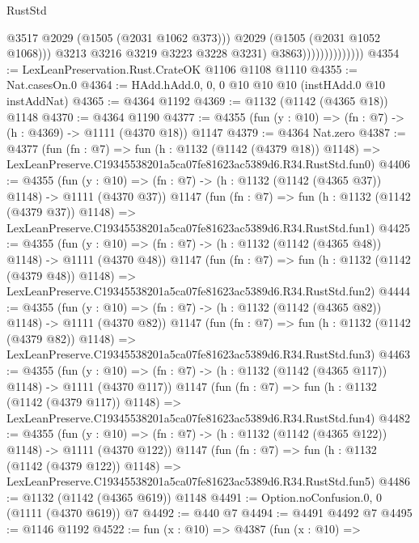 \begin{lexlean}{RustStd}
\begin{coremodule}
                                      @3517
                                      @2029
                                      (@1505 (@2031 @1062 @373)))
                                    @2029
                                    (@1505 (@2031 @1052 @1068)))
                                  @3213
                                  @3216
                                  @3219
                                  @3223
                                  @3228
                                  @3231)
                                @3863))))))))))))))
@4354 := LexLeanPreservation.Rust.CrateOK @1106 @1108 @1110
@4355 := Nat.casesOn.{0}
@4364 := HAdd.hAdd.{0, 0, 0} @10 @10 @10 (instHAdd.{0} @10 instAddNat)
@4365 := @4364 @1192
@4369 := @1132 (@1142 (@4365 @18)) @1148
@4370 := @4364 @1190
@4377 := @4355 (fun (y : @10) => (fn : @7) -> (h : @4369) -> @1111 (@4370 @18)) @1147
@4379 := @4364 Nat.zero
@4387 := @4377
    (fun (fn : @7) =>
    fun (h : @1132 (@1142 (@4379 @18)) @1148) =>
    LexLeanPreserve.C19345538201a5ca07fe81623ac5389d6.R34.RustStd.fun0)
@4406 := @4355
    (fun (y : @10) => (fn : @7) -> (h : @1132 (@1142 (@4365 @37)) @1148) -> @1111 (@4370 @37))
    @1147
    (fun (fn : @7) =>
    fun (h : @1132 (@1142 (@4379 @37)) @1148) =>
    LexLeanPreserve.C19345538201a5ca07fe81623ac5389d6.R34.RustStd.fun1)
@4425 := @4355
    (fun (y : @10) => (fn : @7) -> (h : @1132 (@1142 (@4365 @48)) @1148) -> @1111 (@4370 @48))
    @1147
    (fun (fn : @7) =>
    fun (h : @1132 (@1142 (@4379 @48)) @1148) =>
    LexLeanPreserve.C19345538201a5ca07fe81623ac5389d6.R34.RustStd.fun2)
@4444 := @4355
    (fun (y : @10) => (fn : @7) -> (h : @1132 (@1142 (@4365 @82)) @1148) -> @1111 (@4370 @82))
    @1147
    (fun (fn : @7) =>
    fun (h : @1132 (@1142 (@4379 @82)) @1148) =>
    LexLeanPreserve.C19345538201a5ca07fe81623ac5389d6.R34.RustStd.fun3)
@4463 := @4355
    (fun (y : @10) => (fn : @7) -> (h : @1132 (@1142 (@4365 @117)) @1148) -> @1111 (@4370 @117))
    @1147
    (fun (fn : @7) =>
    fun (h : @1132 (@1142 (@4379 @117)) @1148) =>
    LexLeanPreserve.C19345538201a5ca07fe81623ac5389d6.R34.RustStd.fun4)
@4482 := @4355
    (fun (y : @10) => (fn : @7) -> (h : @1132 (@1142 (@4365 @122)) @1148) -> @1111 (@4370 @122))
    @1147
    (fun (fn : @7) =>
    fun (h : @1132 (@1142 (@4379 @122)) @1148) =>
    LexLeanPreserve.C19345538201a5ca07fe81623ac5389d6.R34.RustStd.fun5)
@4486 := @1132 (@1142 (@4365 @619)) @1148
@4491 := Option.noConfusion.{0, 0} (@1111 (@4370 @619)) @7
@4492 := @440 @7
@4494 := @4491 @4492 @7
@4495 := @1146 @1192
@4522 := fun (x : @10) =>
  @4387
    (fun (x : @10) =>

\end{coremodule}
\end{lexlean}
